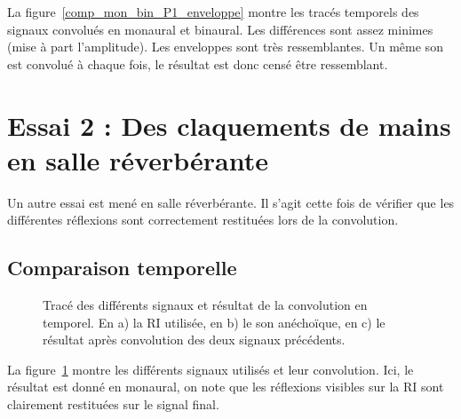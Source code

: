 La figure~\ref{comp_mon_bin_P1_enveloppe} montre les tracés temporels des signaux convolués en monaural et binaural.
Les différences sont assez minimes (mise à part l'amplitude). Les enveloppes sont très ressemblantes. Un même son est
convolué à chaque fois, le résultat est donc censé être ressemblant.

\section{Essai 2 : Des claquements de mains en salle réverbérante} %

Un autre essai est mené en salle réverbérante. Il s'agit cette fois de vérifier que les différentes réflexions sont
correctement restituées lors de la convolution.

\subsection{Comparaison temporelle} %

\begin{figure}[h!]
	\caption{\label{temporel_reverb}Tracé des différents signaux et résultat de la convolution en temporel. En a) la
    RI utilisée, en b) le son anéchoïque, en c) le résultat après convolution des deux signaux précédents.}
\end{figure}

La figure~\ref{temporel_reverb} montre les différents signaux utilisés et leur convolution. Ici, le résultat est donné
en monaural, on note que les réflexions visibles sur la RI sont clairement restituées sur le signal final.


